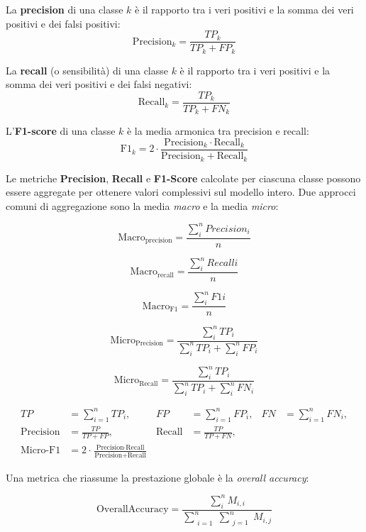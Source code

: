 La \textbf{precision} di una classe $k$ è il rapporto tra i veri positivi e la
somma dei veri positivi e dei falsi positivi:
\[
      \mathrm{Precision}_k = \frac{TP_k}{TP_k + FP_k}
\]

La \textbf{recall} (o sensibilità) di una classe $k$ è il rapporto tra i veri
positivi e la somma dei veri positivi e dei falsi negativi:
\[
      \mathrm{Recall}_k = \frac{TP_k}{TP_k + FN_k}
\]

L'\textbf{F1-score} di una classe $k$ è la media armonica tra precision e recall:
\[
      \mathrm{F1}_k = 2 \cdot \frac{\mathrm{Precision}_k \cdot \mathrm{Recall}_k}
      {\mathrm{Precision}_k + \mathrm{Recall}_k}
\]

Le metriche \textbf{Precision}, \textbf{Recall} e \textbf{F1-Score} calcolate per ciascuna classe
possono essere aggregate per ottenere valori complessivi sul modello intero. Due approcci
comuni di aggregazione sono la media \textit{macro} e la media \textit{micro}:

\[
      \mathrm{Macro_{precision}} = \frac{\sum_{i}^{n} Precision_{i}}{n}
\]

\[
      \mathrm{Macro_{recall}} = \frac{\sum_{i}^{n} Recall{i}}{n}
\]

\[
      \mathrm{Macro_{F1}} = \frac{\sum_{i}^{n} F1{i}}{n}
\]

\[
      \mathrm{Micro_{Precision}} = \frac{\sum_{i}^{n} TP_{i}}{\sum_{i}^{n} TP_{i} + \sum_{i}^{n} FP_{i}}
\]

\[
      \mathrm{Micro_{Recall}} = \frac{\sum_{i}^{n} TP_{i}}{\sum_{i}^{n} TP_{i} + \sum_{i}^{n} FN_{i}}
\]

\[
      \begin{aligned}
            TP               & = \sum_{i=1}^{n} TP_i,                                                                  & FP            & = \sum_{i=1}^{n} FP_i, & FN & = \sum_{i=1}^{n} FN_i, \\[1mm]
            \text{Precision} & = \frac{TP}{TP + FP},                                                                   & \text{Recall} & = \frac{TP}{TP + FN},                                \\[1mm]
            \text{Micro-F1}  & = 2 \cdot \frac{\text{Precision} \cdot \text{Recall}}{\text{Precision} + \text{Recall}}
      \end{aligned}
\]

Una metrica che riassume la prestazione globale è la \textit{overall accuracy}:

\[
      \mathrm{OverallAccuracy} = \frac{\sum_{i}^{n} M_{i,i}}{ \sum_{\substack{i=1}}^{n}
            \sum_{\substack{j=1 }}^{n} M_{i,j}}
\]

